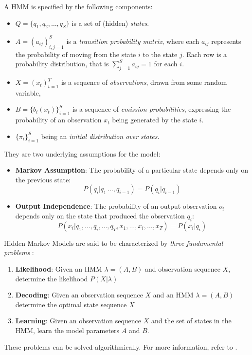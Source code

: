 A HMM is specified by the following components: \begin{itemize}
	\item $Q=\{q_1,q_2,\ldots, q_S\}$ is a set of (hidden) \emph{states}.
	\item $A=(a_{ij})_{i,j=1}^S$ is a \emph{transition probability matrix}, where each $a_{ij}$ represents the probability of moving from the state $i$ to the state $j$. Each row is a probability distribution, that is $\sum_{j=1}^S a_{ij}=1$ for each $i$.
	\item $X=(x_t)_{t=1}^T$ is a sequence of \emph{observations}, drawn from some random variable,
	\item $B=\{b_i(x_t)\}_{i=1}^S$ is a sequence of \emph{emission probabilities}, expressing the probability of an observation $x_t$ being generated by the state $i$.
	\item $\{\pi_i\}_{i=1}^S$ being an \emph{initial distribution over states}.
\end{itemize}

They are two underlying assumptions for the model: \begin{itemize}
	\item {\bf Markov Assumption}: The probability of a particular state depends only on the previous state: $$P\left(q_i|q_1\,\ldots,q_{i-1}\right) = P(q_i|q_{i-1})$$
	\item {\bf Output Independence}: The probability of an output observation $o_i$ depends only on the state that produced the observation $q_i$: $$P\left(x_i|q_1,\ldots,q_i,\ldots,q_T,x_1,\ldots,x_i,\ldots, x_T\right)=P(x_i|q_i)$$
\end{itemize}

Hidden Markov Models are said to be characterized by \emph{three fundamental problems} \cite[p. 213]{Jurafsky2009}: \begin{enumerate}
	\item {\bf Likelihood}: Given an HMM $\lambda = (A, B)$ and observation sequence $X$, determine the likelihood $P(X|\lambda)$
	\item {\bf Decoding}: Given an observation sequence $X$ and an HMM $\lambda=(A, B)$ determine the optimal state sequence $X$
	\item {\bf Learning}: Given an observation sequence $X$ and the set of states in the HMM, learn the model parameters $A$ and $B$.
\end{enumerate}

These problems can be solved algorithmically. For more information, refer to \cite[p. 213--226]{Jurafsky2009}.

